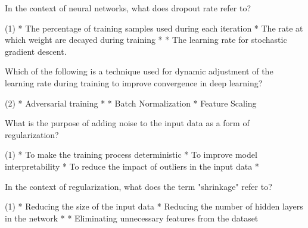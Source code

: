 \documentclass[11pt]{extarticle}
\begin{document}
\begin{exercise}
    In the context of neural networks, what does dropout rate refer to?
    \begin{choice}(1)
        * The percentage of training samples used during each iteration
        * The rate at which weight are decayed during training
        * 
        * The learning rate for stochastic gradient descent.
    \end{choice}
\end{exercise}
\begin{solution}
\end{solution}

\begin{exercise}
    Which of the following is a technique used for dynamic adjustment of the learning rate during training to improve convergence in deep learning?
    \begin{choice}(2)
        * Adversarial training
        * 
        * Batch Normalization
        * Feature Scaling
    \end{choice}
\end{exercise}
\begin{solution}
\end{solution}

\begin{exercise}
    What is the purpose of adding noise to the input data as a form of regularization?
    \begin{choice} (1)
        * To make the training process deterministic
        * To improve model interpretability
        * To reduce the impact of outliers in the input data
        * 
    \end{choice}
\end{exercise}
\begin{solution}
\end{solution}

\begin{exercise}
    In the context of regularization, what does the term "shrinkage" refer to?
    \begin{choice} (1)
        * Reducing the size of the input data
        * Reducing the number of hidden layers in the network
        * 
        * Eliminating unnecessary features from the dataset
    \end{choice}
\end{exercise}
\begin{solution}
\end{solution}
\end{document}
